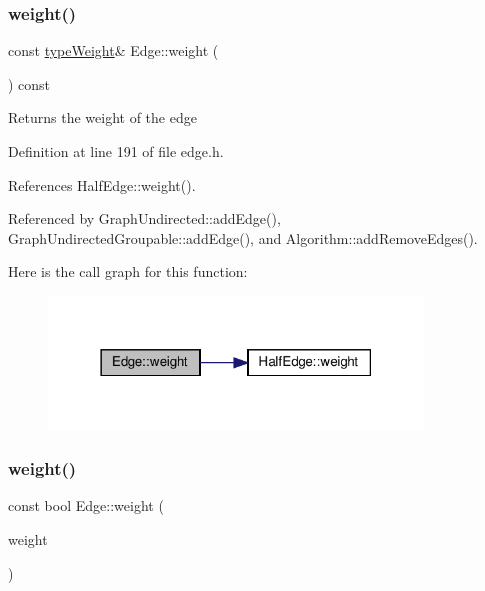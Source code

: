 \subsubsection{\texorpdfstring{weight()}{weight()}\hspace{0.1cm}{\footnotesize\ttfamily [1/2]}}
{\footnotesize\ttfamily const \hyperlink{edge_8h_a2e7ea3be891ac8b52f749ec73fee6dd2}{type\+Weight}\& Edge\+::weight (\begin{DoxyParamCaption}{ }\end{DoxyParamCaption}) const\hspace{0.3cm}{\ttfamily [inline]}}

\begin{DoxyReturn}{Returns}
the weight of the edge 
\end{DoxyReturn}


Definition at line 191 of file edge.\+h.



References Half\+Edge\+::weight().



Referenced by Graph\+Undirected\+::add\+Edge(), Graph\+Undirected\+Groupable\+::add\+Edge(), and Algorithm\+::add\+Remove\+Edges().

Here is the call graph for this function\+:\nopagebreak
\begin{figure}[H]
\begin{center}
\leavevmode
\includegraphics[width=282pt]{classEdge_a9d5634336c89578f1bbbfce20c3938a7_cgraph}
\end{center}
\end{figure}
\mbox{\label{classEdge_abaf02f474e1cdc61f3baf06875b4f38c}} 
\subsubsection{\texorpdfstring{weight()}{weight()}\hspace{0.1cm}{\footnotesize\ttfamily [2/2]}}
{\footnotesize\ttfamily const bool Edge\+::weight (\begin{DoxyParamCaption}\item[{const \hyperlink{edge_8h_a2e7ea3be891ac8b52f749ec73fee6dd2}{type\+Weight} \&}]{weight }\end{DoxyParamCaption})\hspace{0.3cm}{\ttfamily [inline]}}

